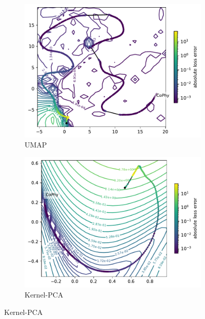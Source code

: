 \documentclass[letterpaper]{article} %
\begin{document}
        \begin{figure}
              \centering
              \begin{subfigure}[b]{0.3\textwidth}
                \includegraphics[width=\textwidth]{figures/round3/UMAP/map_phy_total_abs_error.pdf}
                \caption{UMAP}
              \end{subfigure}
              \begin{subfigure}[b]{0.3\textwidth}
                \includegraphics[width=\textwidth]{figures/round3/Kernel-PCA/map_phy_total_abs_error.pdf}
                \caption{Kernel-PCA}
              \end{subfigure}

\end{figure}
\end{document}
